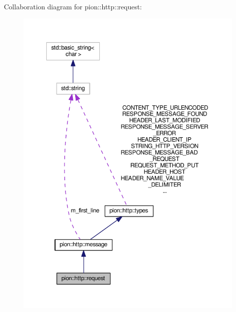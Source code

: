 Collaboration diagram for pion\-:\-:http\-:\-:request\-:
\nopagebreak
\begin{figure}[H]
\begin{center}
\leavevmode
\includegraphics[width=350pt]{classpion_1_1http_1_1request__coll__graph}
\end{center}
\end{figure}
